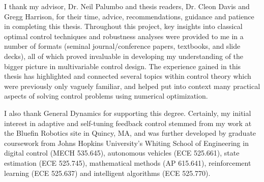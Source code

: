 \label{chap:acknowledgments}

I thank my advisor, Dr. Neil Palumbo and thesis readers, Dr. Cleon Davis and Gregg Harrison, for their time, advice, recommendations, guidance and patience in completing this thesis.  Throughout this project, key insights into classical optimal control techniques and robustness analyses were provided to me in a number of formats (seminal journal/conference papers, textbooks, and slide decks), all of which proved invaluable in developing my understanding of the bigger picture in multivariable control design.  The experience gained in this thesis has highlighted and connected several topics within control theory which were previously only vaguely familiar, and helped put into context many practical aspects of solving control problems using numerical optimization.

I also thank General Dynamics for supporting this degree.  Certainly, my initial interest in adaptive and self-tuning feedback control stemmed from my work at the Bluefin Robotics site in Quincy, MA, and was further developed by graduate coursework from Johns Hopkins University's Whiting School of Engineering in digital control (MECH 535.645), autonomous vehicles (ECE 525.661), state estimation (ECE 525.745), mathematical methods (AP 615.641), reinforcement learning (ECE 525.637) and intelligent algorithms (ECE 525.770).